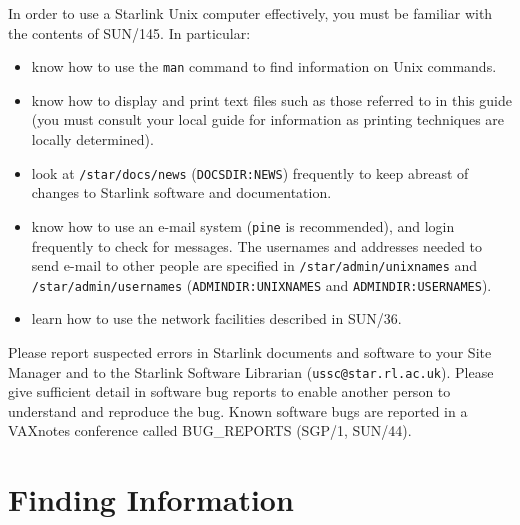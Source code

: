In order to use a Starlink Unix computer effectively, you must be familiar
with the contents of SUN/145.
In particular:
\begin{itemize}
\item know how to use the {\tt man} command to find information on Unix
commands.
\item know how to display and print text files such as those referred to in this
guide (you must consult your local guide for information as printing
techniques are locally determined).
\item look at {\tt /star/\-docs/\-news} ({\tt DOCSDIR:NEWS}) frequently to keep abreast
of changes to Starlink software and documentation.
\item know how to use an e-mail system ({\tt pine} is recommended), and login
frequently to check for messages.
The usernames and addresses needed to send e-mail to other people are
specified in {\tt /star/\-admin/\-unixnames} and {\tt /star/\-admin/\-usernames}
({\tt ADMINDIR:\-UNIXNAMES} and {\tt ADMINDIR:\-USERNAMES}).
\item learn how to use the network facilities described in SUN/36.
\end{itemize}

Please report suspected errors in Starlink documents and software to your Site
Manager and to the Starlink Software Librarian ({\tt ussc@star.rl.ac.uk}).
Please give sufficient detail in software bug reports to enable another person
to understand and reproduce the bug.
Known software bugs are reported in a VAXnotes conference called BUG\_REPORTS
(SGP/1, SUN/44).

\section{Finding Information}

